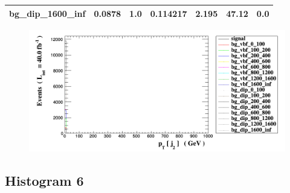 \documentclass[a4paper, 10pt]{article}
\begin{document}
\begin{table}[H]
\begin{center}
\begin{tabular}{|m{23.0mm}|m{23.0mm}|m{18.0mm}|m{19.0mm}|m{19.0mm}|m{19.0mm}|m{19.0mm}|}
      \hline
      {\cellcolor{white}         bg\_dip\_1600\_inf}& {\cellcolor{white}         0.0878}& {\cellcolor{white}         1.0}& {\cellcolor{white}         0.114217}& {\cellcolor{white}         2.195}& {\cellcolor{red}         47.12}& {\cellcolor{red}         0.0}\\
\hline
    \end{tabular}
  \end{center}
\end{table}

\begin{figure}[H]
  \begin{center}
    \includegraphics[scale=0.45]{selection_4.png}\\
\caption{   }
  \end{center}
\end{figure}
      \newpage
\subsection{ Histogram 6}
\end{document}

